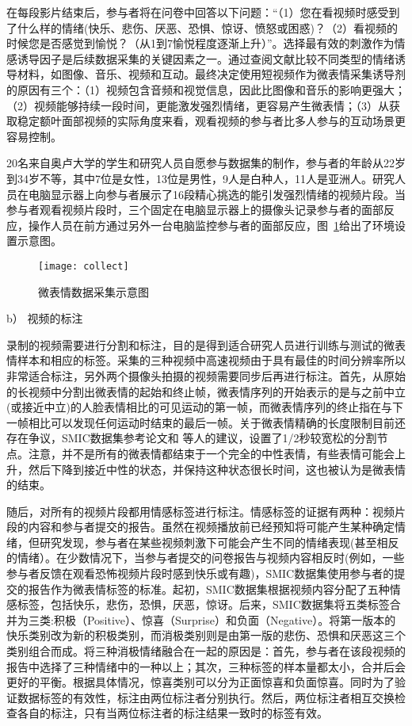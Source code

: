 在每段影片结束后，参与者将在问卷中回答以下问题：“（1）您在看视频时感受到了什么样的情绪(快乐、悲伤、厌恶、恐惧、惊讶、愤怒或困惑)？（2）看视频的时候您是否感觉到愉悦？（从1到7愉悦程度逐渐上升）”。选择最有效的刺激作为情感诱导因子是后续数据采集的关键因素之一。通过查阅文献比较不同类型的情绪诱导材料，如图像、音乐、视频和互动。最终决定使用短视频作为微表情采集诱导剂的原因有三个：（1）视频包含音频和视觉信息，因此比图像和音乐的影响更强大；（2）视频能够持续一段时间，更能激发强烈情绪，更容易产生微表情；（3）从获取稳定额叶面部视频的实际角度来看，观看视频的参与者比多人参与的互动场景更容易控制。

20名来自奥卢大学的学生和研究人员自愿参与数据集的制作，参与者的年龄从22岁到34岁不等，其中7位是女性，13位是男性，9人是白种人，11人是亚洲人。研究人员在电脑显示器上向参与者展示了16段精心挑选的能引发强烈情绪的视频片段。当参与者观看视频片段时，三个固定在电脑显示器上的摄像头记录参与者的面部反应，操作人员在前方通过另外一台电脑监控参与者的面部反应，图~\ref{fig3}给出了环境设置示意图。

\begin{figure}[!htbp]
    \centering
    \texttt{[image: collect]}
    \caption{微表情数据采集示意图}
    \label{fig3}
\end{figure}

b） 视频的标注

录制的视频需要进行分割和标注，目的是得到适合研究人员进行训练与测试的微表情样本和相应的标签。采集的三种视频中高速视频由于具有最佳的时间分辨率所以非常适合标注，另外两个摄像头拍摄的视频需要同步后再进行标注。首先，从原始的长视频中分割出微表情的起始和终止帧，微表情序列的开始表示的是与之前中立(或接近中立)的人脸表情相比的可见运动的第一帧，而微表情序列的终止指在与下一帧相比可以发现任何运动时结束的最后一帧。关于微表情精确的长度限制目前还存在争议，SMIC数据集参考论文和 等人的建议，设置了1/2秒较宽松的分割节点。注意，并不是所有的微表情都结束于一个完全的中性表情，有些表情可能会上升，然后下降到接近中性的状态，并保持这种状态很长时间，这也被认为是微表情的结束。

随后，对所有的视频片段都用情感标签进行标注。情感标签的证据有两种：视频片段的内容和参与者提交的报告。虽然在视频播放前已经预知将可能产生某种确定情绪，但研究发现，参与者在某些视频刺激下可能会产生不同的情绪表现(甚至相反的情绪）。在少数情况下，当参与者提交的问卷报告与视频内容相反时(例如，一些参与者反馈在观看恐怖视频片段时感到快乐或有趣)，SMIC数据集使用参与者的提交的报告作为微表情标签的标准。起初，SMIC数据集根据视频内容分配了五种情感标签，包括快乐，悲伤，恐惧，厌恶，惊讶。后来，SMIC数据集将五类标签合并为三类:积极（Positive）、惊喜（Surprise）和负面（Negative）。将第一版本的快乐类别改为新的积极类别，而消极类别则是由第一版的悲伤、恐惧和厌恶这三个类别组合而成。将三种消极情绪融合在一起的原因是：首先，参与者在该段视频的报告中选择了三种情绪中的一种以上；其次，三种标签的样本量都太小，合并后会更好的平衡。根据具体情况，惊喜类别可以分为正面惊喜和负面惊喜。同时为了验证数据标签的有效性，标注由两位标注者分别执行。然后，两位标注者相互交换检查各自的标注，只有当两位标注者的标注结果一致时的标签有效。

